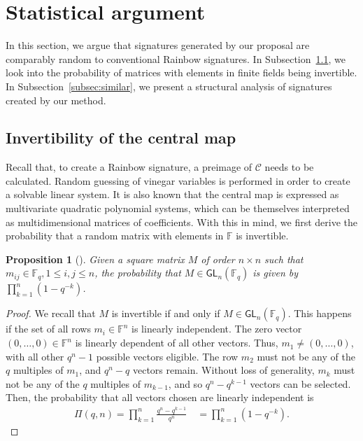\documentclass[english]{ufsc-thesis-rn46-2019/ufsc-thesis-rn46-2019}
\newtheorem{proposition}[theorem]{Proposition}
\theoremstyle{definition}
\begin{document}
\section{Statistical argument}\label{sec:stats}

In this section, we argue that signatures generated by our proposal are
comparably random to conventional Rainbow signatures. In
Subsection~\ref{subsec:invert}, we look into the probability of matrices with
elements in finite fields being invertible. In Subsection~\ref{subsec:similar},
we present a structural analysis of signatures created by our method.

\subsection{Invertibility of the central map}\label{subsec:invert}

Recall that, to create a Rainbow signature, a preimage of $\mathcal{C}$ needs
to be calculated. Random guessing of vinegar variables is performed in order to
create a solvable linear system. It is also known that the central map is
expressed as multivariate quadratic polynomial systems, which can be themselves
interpreted as multidimensional matrices of coefficients. With this in mind, we
first derive the probability that a random matrix with elements in $\mathbb{F}$
is invertible.

\begin{proposition}[{\cite[Remark~13.2.14]{Mullen:2013}}]
  Given a square matrix $M$ of order $n \times n$ such that
  $m_{ij} \in \mathbb{F}_{q}, 1 \leq i, j \leq n$, the probability that
  $M \in \mathsf{GL}_{n}(\mathbb{F}_{q})$ is given by
  $\prod_{k = 1}^{n} (1 - q^{-k})$.
\end{proposition}
\begin{proof}
  We recall that $M$ is invertible if and only if
  $M \in \mathsf{GL}_{n}(\mathbb{F}_{q})$. This happens if the set of all rows
  $m_{i} \in \mathbb{F}^{n}$ is linearly independent. The zero vector
  $(0, \dots, 0) \in \mathbb{F}^{n}$ is linearly dependent of all other vectors.
  Thus, $m_{1} \neq (0, \dots, 0)$, with all other $q^{n} - 1$ possible vectors
  eligible. The row $m_{2}$ must not be any of the $q$ multiples of $m_{1}$,
  and $q^{n} - q$ vectors remain. Without loss of generality, $m_{k}$ must not
  be any of the $q$ multiples of $m_{k - 1}$, and so $q^{n} - q^{k - 1}$
  vectors can be selected. Then, the probability that all vectors chosen are
  linearly independent is
  \begin{align}
    \Pi(q, n) = \prod_{k = 1}^{n} \frac{q^{n} - q^{k - 1}}{q^{n}} \quad
      = \prod_{k = 1}^{n} (1 - q^{-k}).
  \end{align}
\end{proof}
\end{document}

